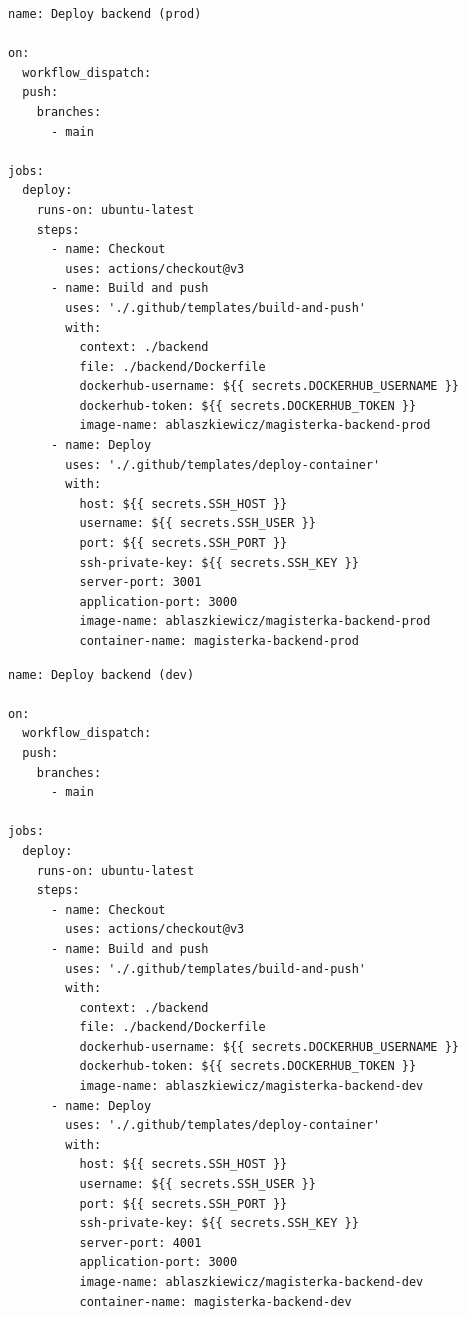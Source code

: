 \documentclass{article}
\begin{document}
\begin{lstlisting}[caption=Plik \texttt{.github/workflows/prod-deploy-backend.yml}]
name: Deploy backend (prod)

on:
  workflow_dispatch:
  push:
    branches:
      - main

jobs:
  deploy:
    runs-on: ubuntu-latest
    steps:
      - name: Checkout
        uses: actions/checkout@v3
      - name: Build and push
        uses: './.github/templates/build-and-push'
        with:
          context: ./backend
          file: ./backend/Dockerfile
          dockerhub-username: ${{ secrets.DOCKERHUB_USERNAME }}
          dockerhub-token: ${{ secrets.DOCKERHUB_TOKEN }}
          image-name: ablaszkiewicz/magisterka-backend-prod
      - name: Deploy
        uses: './.github/templates/deploy-container'
        with:
          host: ${{ secrets.SSH_HOST }}
          username: ${{ secrets.SSH_USER }}
          port: ${{ secrets.SSH_PORT }}
          ssh-private-key: ${{ secrets.SSH_KEY }}
          server-port: 3001
          application-port: 3000
          image-name: ablaszkiewicz/magisterka-backend-prod
          container-name: magisterka-backend-prod

\end{lstlisting}

\begin{lstlisting}[caption=Plik \texttt{.github/workflows/dev-deploy-backend.yml}]
name: Deploy backend (dev)

on:
  workflow_dispatch:
  push:
    branches:
      - main

jobs:
  deploy:
    runs-on: ubuntu-latest
    steps:
      - name: Checkout
        uses: actions/checkout@v3
      - name: Build and push
        uses: './.github/templates/build-and-push'
        with:
          context: ./backend
          file: ./backend/Dockerfile
          dockerhub-username: ${{ secrets.DOCKERHUB_USERNAME }}
          dockerhub-token: ${{ secrets.DOCKERHUB_TOKEN }}
          image-name: ablaszkiewicz/magisterka-backend-dev
      - name: Deploy
        uses: './.github/templates/deploy-container'
        with:
          host: ${{ secrets.SSH_HOST }}
          username: ${{ secrets.SSH_USER }}
          port: ${{ secrets.SSH_PORT }}
          ssh-private-key: ${{ secrets.SSH_KEY }}
          server-port: 4001
          application-port: 3000
          image-name: ablaszkiewicz/magisterka-backend-dev
          container-name: magisterka-backend-dev

\end{lstlisting}
\end{document}
